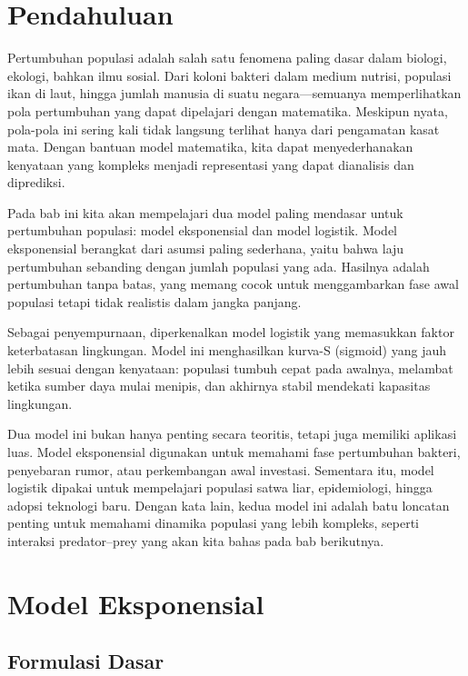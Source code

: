 \documentclass{bukumjh}
\begin{document}
\section{Pendahuluan}

Pertumbuhan populasi adalah salah satu fenomena paling dasar dalam biologi, ekologi, bahkan ilmu sosial. Dari koloni bakteri dalam medium nutrisi, populasi ikan di laut, hingga jumlah manusia di suatu negara—semuanya memperlihatkan pola pertumbuhan yang dapat dipelajari dengan matematika. Meskipun nyata, pola-pola ini sering kali tidak langsung terlihat hanya dari pengamatan kasat mata. Dengan bantuan model matematika, kita dapat menyederhanakan kenyataan yang kompleks menjadi representasi yang dapat dianalisis dan diprediksi.

Pada bab ini kita akan mempelajari dua model paling mendasar untuk pertumbuhan populasi: {\jsg model eksponensial} dan {\jsg model logistik}. Model eksponensial berangkat dari asumsi paling sederhana, yaitu bahwa laju pertumbuhan sebanding dengan jumlah populasi yang ada. Hasilnya adalah pertumbuhan tanpa batas, yang memang cocok untuk menggambarkan fase awal populasi tetapi tidak realistis dalam jangka panjang. 

Sebagai penyempurnaan, diperkenalkan model logistik yang memasukkan faktor keterbatasan lingkungan. Model ini menghasilkan kurva-S (sigmoid) yang jauh lebih sesuai dengan kenyataan: populasi tumbuh cepat pada awalnya, melambat ketika sumber daya mulai menipis, dan akhirnya stabil mendekati kapasitas lingkungan.

Dua model ini bukan hanya penting secara teoritis, tetapi juga memiliki aplikasi luas. Model eksponensial digunakan untuk memahami fase pertumbuhan bakteri, penyebaran rumor, atau perkembangan awal investasi. Sementara itu, model logistik dipakai untuk mempelajari populasi satwa liar, epidemiologi, hingga adopsi teknologi baru. Dengan kata lain, kedua model ini adalah batu loncatan penting untuk memahami dinamika populasi yang lebih kompleks, seperti interaksi predator–prey yang akan kita bahas pada bab berikutnya.

\section{Model Eksponensial}

\subsection*{Formulasi Dasar}
\end{document}
